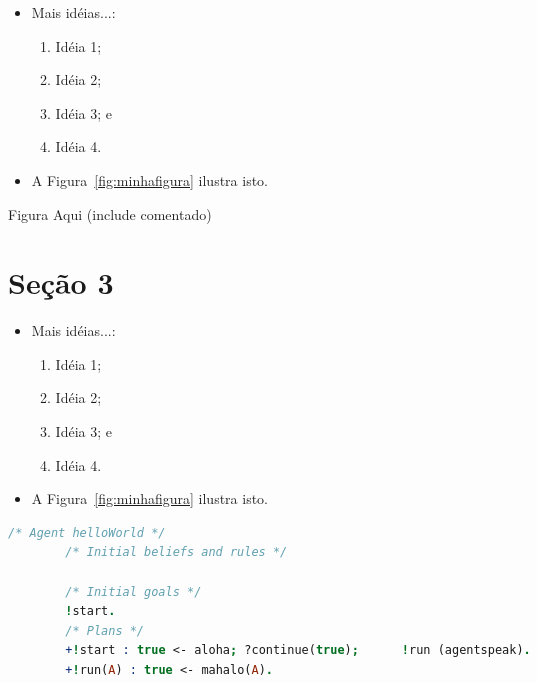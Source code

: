 \documentclass[a0,portrait]{lab-poster}
\begin{document}
\begin{multicols}{2}
\vspace{13mm}


\begin{itemize}
	\item Mais idéias...:
	\begin{enumerate}
		\item Idéia 1;
		\item Idéia 2; 
		\item Idéia 3; e
		\item Idéia 4.
	\end{enumerate}	
	\item A Figura~\ref{fig:minhafigura} ilustra isto.
\end{itemize}
\vspace{13mm}

\begin{center}
	\Huge Figura Aqui (include comentado)
	\label{fig:minhafigura}
\end{center}	


\section*{Seção 3}

\begin{itemize}
	\item Mais idéias...:
	\begin{enumerate}
		\item Idéia 1;
		\item Idéia 2; 
		\item Idéia 3; e
		\item Idéia 4.
	\end{enumerate}	
	\item A Figura~\ref{fig:minhafigura} ilustra isto.
\end{itemize}


\vspace{13mm}
\noindent\begin{minipage}{.235\textwidth}
	\begin{minipage}{\textwidth}
		\lstset{style=codeStyle}
		\begin{lstlisting}[language=Prolog, label={alg:exemplo-hello-world}, caption={Exemplo de programa em AgentSpeak(L).}]
		/* Agent helloWorld */
		/* Initial beliefs and rules */
		
		/* Initial goals */			
		!start.
		/* Plans */
		+!start : true <- aloha; ?continue(true);      !run (agentspeak).
		+!run(A) : true <- mahalo(A).
		\end{lstlisting}
	\end{minipage}\hfill
	\vspace{7mm}
	

\end{minipage}
\end{multicols}
\end{document}
